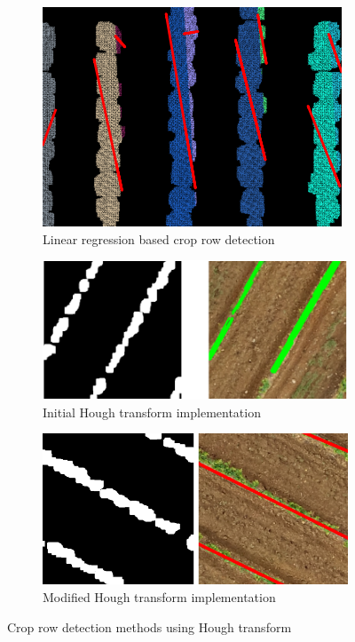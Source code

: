 \documentclass[conference]{IEEEtran}
\begin{document}
	\begin{figure}[t]
		\centering
		\begin{subfigure}{\linewidth}
			\centering
			\includegraphics[width=0.5\linewidth]{Kmeans_Row_Result.png}
			\caption{Linear regression based crop row detection}
			\label{fig_Linear_Regression}
		\end{subfigure}
		
		\vspace{0.5cm}
		
		\begin{subfigure}{\linewidth}
			\centering
			\includegraphics[width=0.7\linewidth]{Hough initial2.png}
			\caption{Initial Hough transform implementation}
			\label{fig_Hough_Init}
		\end{subfigure}
		
		\vspace{0.5cm} %
		
		\begin{subfigure}{\linewidth}
			\centering
			\includegraphics[width=0.7\linewidth]{Hough Revised2.png}
			\caption{Modified Hough transform implementation}
			\label{fig_Hough_mod}
		\end{subfigure}
		
		\caption{Crop row detection methods using Hough transform \cite{b5}}
		\label{fig:comparison}
	\end{figure}
	
\end{document}
